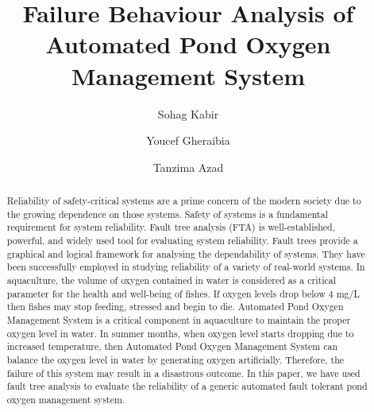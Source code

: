 \documentclass[10pt]{llncs}
\begin{document}
%
\title{Failure Behaviour Analysis of Automated Pond Oxygen Management System}

\author{Sohag Kabir\and Youcef Gheraibia\and Tanzima Azad}
\maketitle


\begin{abstract}
Reliability of safety-critical systems are a prime concern of the modern society due to the growing dependence on those systems. Safety of systems is a fundamental requirement for system reliability. Fault tree analysis (FTA) is well-established, powerful, and widely used tool for evaluating system reliability. Fault trees provide a graphical and logical framework for analysing the dependability of systems. They have been successfully employed in studying reliability of a variety of real-world systems. In aquaculture, the volume of oxygen contained in water is considered as a critical parameter for the health and well-being of fishes. If oxygen levels drop below 4 mg/L then fishes may stop feeding, stressed and begin to die. Automated Pond Oxygen Management System is a critical component in aquaculture to maintain the proper oxygen level in water. In summer months, when oxygen level starts dropping due to increased temperature, then Automated Pond Oxygen Management System can balance the oxygen level in water by generating oxygen artificially. Therefore, the failure of this system may result in a disastrous outcome. In this paper, we have used fault tree analysis to evaluate the reliability of a generic automated fault tolerant pond oxygen management system.
\end{abstract}
\end{document}
